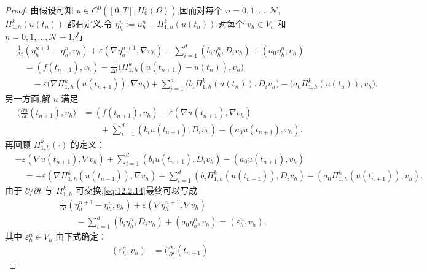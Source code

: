 \begin{proof}
由假设可知 \(u\in C^0([0,T];H_0^1(\Omega))\),因而对每个 \(n=0,1,\ldots,\mathcal N\),\(\Pi_{1,h}^k(u(t_n))\) 都有定义.令 \(\eta_h^n:=u_h^n-\Pi_{1,h}^k(u(t_n))\).对每个 \(v_h\in V_h\) 和 \(n=0,1,\ldots,\mathcal N-1\),有
\begin{equation}\label{eq:12.2.14}
  \begin{aligned}
    &\frac1{\Delta t}(\eta_h^{n+1}-\eta_h^n,v_h)
      +\varepsilon(\nabla\eta_h^{n+1},\nabla v_h)
      -\sum_{i=1}^d(b_i\eta_h^n,D_iv_h)+(a_0\eta_h^n,v_h)\\
    &\quad=(f(t_{n+1}),v_h)
      -\frac1{\Delta t}\bigl(\Pi_{1,h}^k(u(t_{n+1})-u(t_n)),v_h\bigr)\\
    &\qquad-\varepsilon\bigl(\nabla\Pi_{1,h}^k(u(t_{n+1})),\nabla v_h\bigr)
      +\sum_{i=1}^d\bigl(b_i\Pi_{1,h}^k(u(t_n)),D_iv_h\bigr)
      -\bigl(a_0\Pi_{1,h}^k(u(t_n)),v_h\bigr).
  \end{aligned}
\end{equation}
另一方面,解 \(u\) 满足
\[
  \begin{aligned}
    \biggl(\frac{\partial u}{\partial t}(t_{n+1}),v_h\biggr)
      &=(f(t_{n+1}),v_h)-\varepsilon(\nabla u(t_{n+1}),\nabla v_h)\\
      &\qquad+\sum_{i=1}^d(b_iu(t_{n+1}),D_iv_h)-(a_0u(t_{n+1}),v_h).
  \end{aligned}
\]
再回顾 \(\Pi_{1,h}^k(\cdot)\) 的定义：
\[
  \begin{aligned}
    &-\varepsilon(\nabla u(t_{n+1}),\nabla v_h)
       +\sum_{i=1}^d(b_iu(t_{n+1}),D_iv_h)-(a_0u(t_{n+1}),v_h)\\
    &\quad=-\varepsilon(\nabla\Pi_{1,h}^k(u(t_{n+1})),\nabla v_h)
      +\sum_{i=1}^d(b_i\Pi_{1,h}^k(u(t_{n+1})),D_iv_h)
      -(a_0\Pi_{1,h}^k(u(t_{n+1})),v_h).
  \end{aligned}
\]
由于 \(\partial/\partial t\) 与 \(\Pi_{1,h}^k\) 可交换,\eqref{eq:12.2.14}最终可以写成
\[
  \begin{aligned}
    &\frac1{\Delta t}(\eta_h^{n+1}-\eta_h^n,v_h)
       +\varepsilon(\nabla\eta_h^{n+1},\nabla v_h)\\
    &\qquad-\sum_{i=1}^d(b_i\eta_h^n,D_iv_h)+(a_0\eta_h^n,v_h)
       =(\varepsilon_h^n,v_h),
  \end{aligned}
\]
其中 \(\varepsilon_h^n\in V_h\) 由下式确定：
\begin{equation}\label{eq:12.2.15}
  \begin{aligned}
    (\varepsilon_h^n,v_h)
      &=\biggl(\frac{\partial u}{\partial t}(t_{n+1})

\end{aligned}
\end{equation}
\end{proof}
